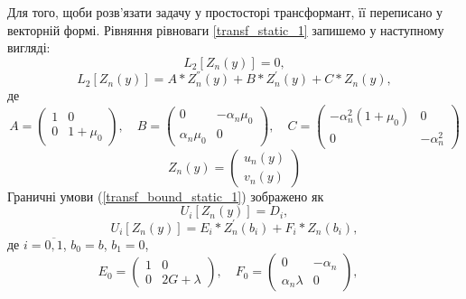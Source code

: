 Для того, щоби розв'язати задачу у простосторі трансформант, її переписано у векторній формі.
Рівняння рівноваги \eqref{transf_static_1} запишемо у наступному вигляді:
\begin{equation}\label{transf_mat_static_1}
    L_2\left[ Z_n(y) \right] = 0,
\end{equation}
\begin{equation}
    L_2\left[ Z_n(y) \right] = A * Z_n^{''}(y) + B * Z_n^{'}(y) + C * Z_n(y),
\end{equation}
де
\begin{equation*}
    A = \begin{pmatrix}
        1 & 0 \\
        0 & 1 + \mu_0
    \end{pmatrix}, \quad
    B = \begin{pmatrix}
        0 & -\alpha_n \mu_0 \\
        \alpha_n \mu_0 & 0
    \end{pmatrix}, \quad
    C = \begin{pmatrix}
        -\alpha_n^2(1 + \mu_0) & 0 \\
        0 & -\alpha_n^2
    \end{pmatrix}
\end{equation*}
\begin{equation*}
    Z_n(y) = \begin{pmatrix}
        u_n(y) \\
        v_n(y)
    \end{pmatrix}
\end{equation*}
Граничні умови (\ref{transf_bound_static_1}) зображено як
\begin{equation}\label{transf_bound_mat_static_1}
    U_i\left[ Z_n(y) \right] = D_i,
\end{equation}
\begin{equation}
    U_i\left[ Z_n(y) \right] = E_i * Z_n^{'}(b_i) + F_i * Z_n(b_i),
\end{equation}
де $i = \overline{0, 1}$, $b_0 = b$, $b_1 = 0$,
\begin{equation*}
    E_0 = \begin{pmatrix}
        1 & 0 \\
        0 & 2G + \lambda
    \end{pmatrix}, \quad
    F_0 = \begin{pmatrix}
        0 & -\alpha_n \\
        \alpha_n \lambda & 0
    \end{pmatrix}, \quad
\end{equation*}

